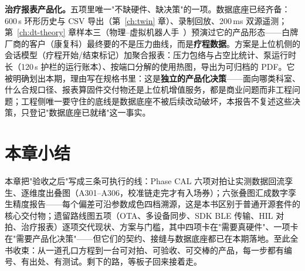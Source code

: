 \textbf{治疗报表产品化。}五项里唯一"不缺硬件、缺决策"的一项。数据底座已经齐备：600\,s 环形历史与 CSV 导出（第~\ref{ch:twin} 章）、录制回放、200\,ms 双源遥测；第~\ref{ch:dt-theory} 章样本三（物理--虚拟机器人手~\cite{Singh2024}）预演过它的产品形态——白牌厂商的客户（康复科）最终要的不是压力曲线，而是\textbf{疗程数据}。方案是上位机侧的会话模型（疗程开始/结束标记）加聚合报表：压力包络与占空比统计、泵运行时长（120\,s 护栏的运行账本）、按端口分解的使用热图，导出为可归档的 PDF。它被明确划出本期，理由写在规格书里：这是\textbf{独立的产品化决策}——面向哪类科室、什么合规口径、报表算固件交付物还是上位机增值服务，都是商业问题而非工程问题；工程侧唯一要守住的底线是数据底座不被后续改动破坏，本报告不复述这些决策，只登记"数据底座已就绪"这一事实。

\section*{本章小结}
本章把"验收之后"写成三条可执行的线：Phase CAL 六项对拍让实测数据回流孪生、逐维度出叠图（A301--A306，校准链走完才有入场券）；六张叠图汇成数字孪生精度报告——每个偏差可沿参数成色四档溯源，这是本书区别于普通开源套件的核心交付物；遗留路线图五项（OTA、多设备同步、SDK BLE 传输、HIL 对拍、治疗报表）逐项交代现状、方案与门槛，其中四项卡在"需要真硬件"、一项卡在"需要产品化决策"——但它们的契约、接缝与数据底座都已在本期落地。至此全书收束：从一道孔口方程到一台可对拍、可验收、可交棒的产品，每一步都有编号、有出处、有测试。剩下的路，等板子回来接着走。
